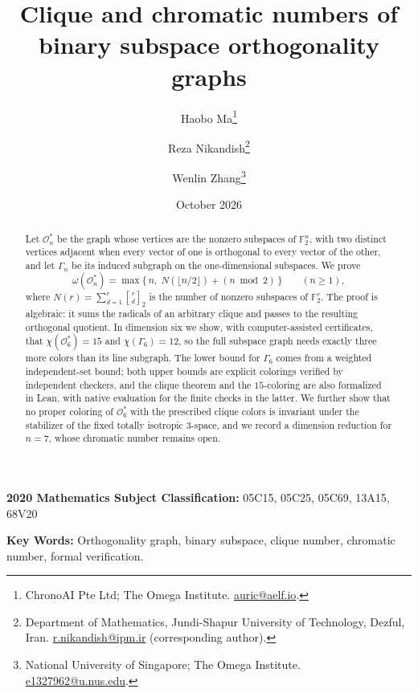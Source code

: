 \documentclass[11pt]{article}
\title{Clique and chromatic numbers of binary subspace orthogonality graphs}
\author{Haobo Ma\thanks{ChronoAI Pte Ltd; The Omega Institute.
  \href{mailto:auric@aelf.io}{auric@aelf.io}.}
  \and
  Reza Nikandish\thanks{Department of Mathematics,
  Jundi-Shapur University of Technology, Dezful, Iran.
  \href{mailto:r.nikandish@ipm.ir}{r.nikandish@ipm.ir}
  (corresponding author).}
  \and
  Wenlin Zhang\thanks{National University of Singapore; The Omega Institute.
  \href{mailto:e1327962@u.nus.edu}{e1327962@u.nus.edu}.}}
\date{October 2026}
\theoremstyle{remark}
\theoremstyle{definition}
\newcommand{\F}{\mathbb F_2}
\newcommand{\OG}{\mathcal O}
\begin{document}
\maketitle

\begin{abstract}
Let $\OG_n^*$ be the graph whose vertices are the nonzero subspaces of
$\F^n$, with two distinct vertices adjacent when every vector of one is
orthogonal to every vector of the other, and let $\Gamma_n$ be its
induced subgraph on the one-dimensional subspaces. We prove
\[
  \omega(\OG_n^*)=\max\bigl\{\,n,\; N(\lfloor n/2\rfloor)+(n \bmod 2)\,\bigr\}
  \qquad (n\ge 1),
\]
where $N(r)=\sum_{d=1}^{r}\genfrac{[}{]}{0pt}{}{r}{d}_2$ is the number of nonzero
subspaces of $\F^r$. The proof is algebraic: it sums the radicals of an
arbitrary clique and passes to the resulting orthogonal quotient. In
dimension six we show, with computer-assisted certificates, that
$\chi(\OG_6^*)=15$ and $\chi(\Gamma_6)=12$, so the full subspace graph
needs exactly three more colors than its line subgraph. The lower bound
for $\Gamma_6$ comes from a weighted independent-set bound; both upper
bounds are explicit colorings verified by independent checkers, and the
clique theorem and the $15$-coloring are also formalized in Lean,
with native evaluation for the finite checks in the latter. We
further show that no proper coloring of $\OG_6^*$ with the prescribed
clique colors is invariant under the stabilizer of the fixed totally
isotropic $3$-space, and we record a dimension reduction for $n=7$,
whose chromatic number remains open.
\end{abstract}

\medskip
\noindent\textbf{2020 Mathematics Subject Classification:}
05C15, 05C25, 05C69, 13A15, 68V20

\medskip
\noindent\textbf{Key Words:}
Orthogonality graph, binary subspace, clique number,
chromatic number, formal verification.








\end{document}
